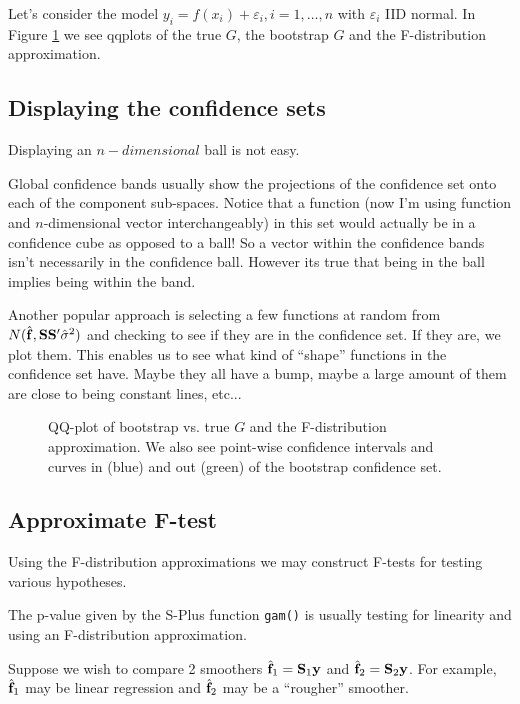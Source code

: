 Let's consider the model $y_i = f(x_i) + \varepsilon_i, i=1,\dots,n$
with $\varepsilon_i$ IID normal.  In Figure \ref{f5.8} we see
qqplots of the true $G$, the bootstrap $G$ and the F-distribution
approximation. 




\subsection{Displaying the confidence sets}
Displaying an $n-dimensional$ ball is not easy. 

Global confidence
bands usually show the projections of the confidence set onto each of
the component sub-spaces. Notice that a
function (now I'm using function and $n$-dimensional vector
interchangeably) in this set would actually be in a confidence cube as opposed
to a ball! So a vector within the confidence bands isn't necessarily in the confidence
ball. However its true that being in the ball implies being within the
band. 

Another popular approach is selecting a few functions at random from
$N(\hat{{\mathbf f}},{\mathbf S}{\mathbf S}'\hat{\sigma}^2)$ and checking to see if they are in
the confidence set. If they are, we plot them. This enables us to see
what kind of ``shape'' functions in the confidence set have. Maybe
they all have a bump, maybe a large amount of them are close to being
constant lines, etc...

\begin{figure}[htb]
\caption{\label{f5.8} QQ-plot of bootstrap vs. true $G$ and the
  F-distribution approximation. We also see point-wise confidence
  intervals and curves in (blue) and out (green) of the bootstrap
  confidence set.}
\begin{center}
\end{center}
\end{figure}

\subsection{Approximate F-test}
Using the F-distribution approximations we may construct F-tests for 
testing various hypotheses.

The p-value given by the S-Plus function {\tt gam()} is usually
testing for linearity and using an F-distribution approximation.

Suppose we wish to compare 2 smoothers $\hat{{\mathbf f}}_1 = {\mathbf S}_1 {\mathbf y}$ and
$\hat{{\mathbf f}}_2 = {\mathbf S}_2 {\mathbf y}$. For example, $\hat{{\mathbf f}}_1$ may be linear
regression and $\hat{{\mathbf f}}_2$ may be a ``rougher'' smoother. 

